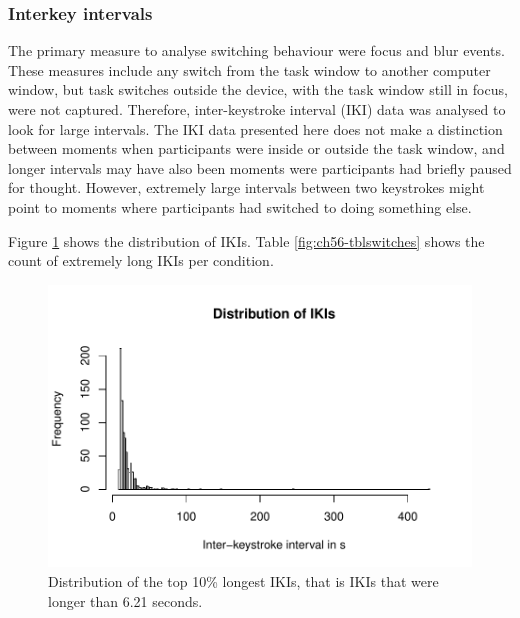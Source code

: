 \subsubsection{Interkey intervals}
The primary measure to analyse switching behaviour were focus and blur events. These measures include any switch from the task window to another computer window, but task switches outside the device, with the task window still in focus, were not captured. Therefore, inter-keystroke interval (IKI) data was analysed to look for large intervals. The IKI data presented here does not make a distinction between moments when participants were inside or outside the task window, and longer intervals may have also been moments were participants had briefly paused for thought. However, extremely large intervals between two keystrokes might point to moments where participants had switched to doing something else. 

Figure \ref{fig:ch56-histikis} shows the distribution of IKIs. Table \ref{fig:ch56-tblswitches} shows the count of extremely long IKIs per condition.

\begin{figure}
\centering
\includegraphics[width=\textwidth]{images/ch56/ch56-histikis.pdf}
\caption{Distribution of the top 10\% longest IKIs, that is IKIs that were longer than 6.21 seconds.}
\label{fig:ch56-histikis}
\end{figure}

